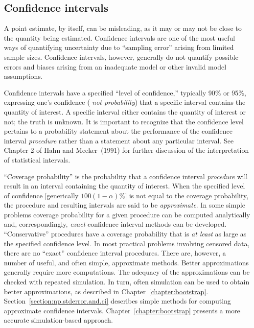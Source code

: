 \subsection{Confidence intervals} 
\label{section:confidence.intervals}
A point estimate, by itself, can be misleading, as it may or may not be
close to the quantity being estimated.
Confidence intervals are one of the most useful
ways of quantifying uncertainty due to ``sampling error'' arising from
limited sample sizes. Confidence intervals, however, generally do not quantify
possible errors and biases arising from an inadequate model or other invalid
model assumptions.

Confidence intervals have a specified ``level of
confidence,'' typically 90\% or 95\%, expressing one's confidence ({\em
not probability}) that a specific interval
contains the quantity of interest. A specific interval either contains
the quantity of interest or not; the truth is unknown.  It
is important to recognize that the confidence level pertains to a 
probability statement
about the performance of the confidence interval {\em procedure} rather
than a statement about any particular interval.  See Chapter 2 of Hahn
and Meeker~(1991) for further discussion of the interpretation of 
statistical intervals.

``Coverage probability'' is the probability that a confidence interval
{\em procedure} will result in an interval containing the quantity of
interest. When the specified level of confidence [generically
$100(1-\alpha)\%$] is not equal to the coverage probability, the procedure
and resulting intervals are said to be {\em approximate}.  In some
simple problems coverage probability for a given procedure can be
computed analytically and, correspondingly, {\em exact} confidence
interval methods can be developed. ``Conservative'' procedures have a
coverage probability
that is {\em at least} as large as the specified confidence level.
In most practical problems
involving censored data, there are no ``exact'' confidence interval
procedures. There are, however, a number of useful, and often simple,
approximate methods.  Better approximations generally require more
computations. The adequacy of the approximations can be checked with
repeated simulation. In turn, often simulation can be used to obtain
better approximations, as described in Chapter~\ref{chapter:bootstrap}.
Section~\ref{section:np.stderror.and.ci} describes simple methods
for computing approximate confidence intervals.  
Chapter~\ref{chapter:bootstrap}
presents a more accurate simulation-based approach.

